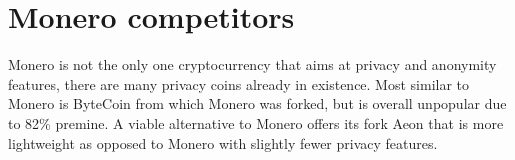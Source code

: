 \documentclass[
  printed, %
  table,   %
  nolof,     %
  nolot,     %
           oneside, color
]{fithesis3}
\begin{document}
\section{Monero competitors}
Monero is not the only one cryptocurrency that aims at privacy and anonymity features, there are many privacy coins already in existence. Most similar to Monero is ByteCoin from which Monero was forked, but is overall unpopular due to 82\% premine.  A viable alternative to Monero offers its fork Aeon that is more lightweight as opposed to Monero with slightly fewer privacy features.

\end{document}
